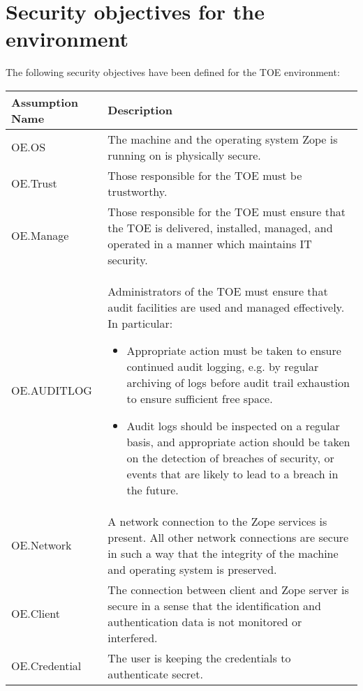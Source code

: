 \documentclass[10pt,a4paper,english]{scrbook}
\begin{document}

\hypertarget{security-objectives-for-the-environment}{}
\section{Security objectives for the environment}

The following security objectives have been defined for the TOE environment:

\begin{tabularx}{\linewidth}{|l|X|}
\hline
Assumption Name  &  Description \\
\hline

OE.OS
 & 
The machine and the operating system Zope is running
on is physically secure.
 \\
\hline

OE.Trust
 & 
Those responsible for the TOE must be trustworthy.
 \\
\hline

OE.Manage
 & 
Those responsible for the TOE must ensure that the TOE
is delivered, installed, managed, and operated in a
manner which maintains IT security.
 \\
\hline

OE.AUDITLOG
 & 
Administrators of the TOE must ensure that audit
facilities are used and managed effectively. In
particular:

\begin{itemize}
\item 
Appropriate action must be taken to ensure continued
audit logging, e.g. by regular archiving of logs
before audit trail exhaustion to ensure sufficient
free space.

\item 
Audit logs should be inspected on a regular basis,
and appropriate action should be taken on the
detection of breaches of security, or events that
are likely to lead to a breach in the future.

\end{itemize}
 \\
\hline

OE.Network
 & 
A network connection to the Zope services is present.
All other network connections are secure in such a
way that the integrity of the machine and operating
system is preserved.
 \\
\hline

OE.Client
 & 
The connection between client and Zope server is secure
in a sense that the identification and authentication
data is not monitored or interfered.
 \\
\hline

OE.Credential
 & 
The user is keeping the credentials to authenticate
secret.
 \\
\hline
\end{tabularx}
\end{document}
